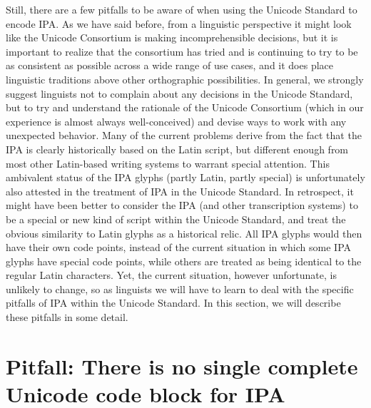 Still, there are a few pitfalls to be aware of when using the Unicode Standard to encode IPA. As we have said before, from a linguistic perspective it might look like the Unicode Consortium is making incomprehensible decisions, but it is important to realize that the consortium has tried and is continuing to try to be as consistent as possible across a wide range of use cases, and it does place linguistic traditions above other orthographic possibilities. In general, we strongly suggest linguists not to complain about any decisions in the Unicode Standard, but to try and understand the rationale of the Unicode Consortium (which in our experience is almost always well-conceived) and devise ways to work with any unexpected behavior. Many of the current problems derive from the fact that the IPA is clearly historically based on the Latin script, but different enough from most other Latin-based writing systems to warrant special attention. This ambivalent status of the IPA glyphs (partly Latin, partly special) is unfortunately also attested in the treatment of IPA in the Unicode Standard. In retrospect, it might have been better to consider the IPA (and other transcription systems) to be a special or new kind of script within the Unicode Standard, and treat the obvious similarity to Latin glyphs as a historical relic. All IPA glyphs would then have their own code points, instead of the current situation in which some IPA glyphs have special code points, while others are treated as being identical to the regular Latin characters. Yet, the current situation, however unfortunate, is unlikely to change, so as linguists we will have to learn to deal with the specific pitfalls of IPA within the Unicode Standard. In this section, we will describe these pitfalls in some detail.

\section{Pitfall: There is no single complete Unicode code block for IPA}
\label{pitfall-there-is-no-single-complete-unicode-code-block-for-ipa}

